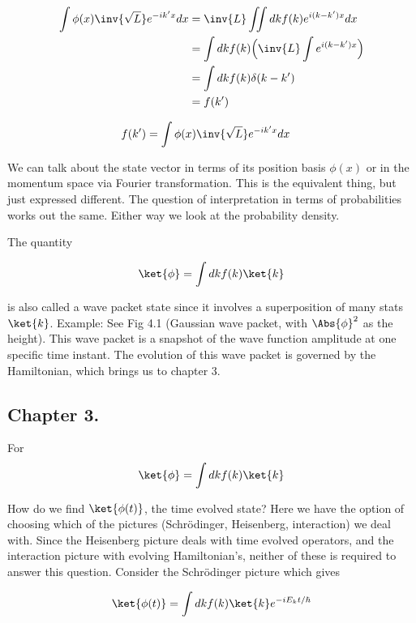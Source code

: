 \begin{align*}
\int \phi(x) \inv{\sqrt{L}} e^{-ik'x} dx
&= \inv{L} \iint dk f(k) e^{i(k-k')x} dx \\
&= \int dk f(k) \Bigl( \inv{L} \int e^{i(k-k')x} \Bigr) \\
&= \int dk f(k) \delta(k-k') \\
&= f(k')
\end{align*}

\begin{align*}
f(k') &=
\int \phi(x) \inv{\sqrt{L}} e^{-ik'x} dx
\end{align*}

We can talk about the state vector in terms of its position basis $\phi(x)$ or in the momentum space via Fourier transformation.  This is the equivalent thing, but just expressed different.  The question of interpretation in terms of probabilities works out the same.  Either way we look at the probability density.

The quantity

\begin{align*}
\ket{\phi} = \int dk f(k) \ket{k}
\end{align*}

is also called a wave packet state since it involves a superposition of many stats $\ket{k}$.  Example: See Fig 4.1 (Gaussian wave packet, with $\Abs{\phi}^2$ as the height).  This wave packet is a snapshot of the wave function amplitude at one specific time instant.  The evolution of this wave packet is governed by the Hamiltonian, which brings us to chapter 3.

\subsection{Chapter 3.}

For
\begin{align*}
\ket{\phi} = \int dk f(k) \ket{k}
\end{align*}

How do we find $\ket{\phi(t)}$, the time evolved state?  Here we have the option of choosing which of the pictures (Schr\"{o}dinger, Heisenberg, interaction) we deal with.  Since the Heisenberg picture deals with time evolved operators, and the interaction picture with evolving Hamiltonian's, neither of these is required to answer this question.  Consider the Schr\"{o}dinger picture which gives

\begin{align*}
\ket{\phi(t)} = \int dk f(k) \ket{k} e^{-i E_k t/\hbar}
\end{align*}

